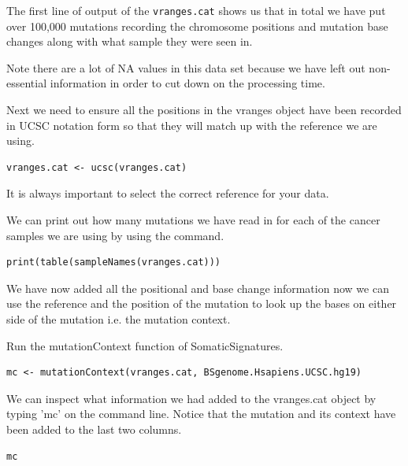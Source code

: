 \begin{information}
The first line of output of the \texttt{vranges.cat} shows us that in total we have
put over 100,000 mutations recording the chromosome positions and mutation base
changes along with what sample they were seen in.
\end{information}

\begin{note}
Note there are a lot of NA values in this data set because we have left out
non-essential information in order to cut down on the processing time.
\end{note}

\begin{steps}
Next we need to ensure all the positions in the vranges object have been recorded
in UCSC notation form so that they will match up with the reference we are using. 
\begin{lstlisting}
vranges.cat <- ucsc(vranges.cat)
\end{lstlisting}
\end{steps}

\begin{note}
It is always important to select the correct reference for your data.
\end{note}

\begin{steps}
We can print out how many mutations we have read in for each of the cancer samples we are using by using the command.
\begin{lstlisting}
print(table(sampleNames(vranges.cat)))
\end{lstlisting}
\end{steps}

\begin{information}
We have now added all the positional and base change information now we can
use the reference and the position of the mutation to look up the bases on
either side of the mutation i.e. the mutation context.
\end{information}

\begin{steps}
Run the mutationContext function of SomaticSignatures.
\begin{lstlisting}
mc <- mutationContext(vranges.cat, BSgenome.Hsapiens.UCSC.hg19)
\end{lstlisting}

We can inspect what information we had added to the vranges.cat
object by typing 'mc' on the command line. Notice that the mutation
and its context have been added to the last two columns.
\begin{lstlisting}
mc
\end{lstlisting}
\end{steps}

